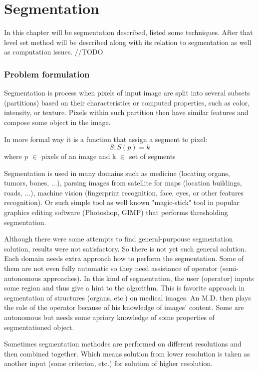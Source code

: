\chapter{Segmentation}

In this chapter will be segmentation described, listed some techniques. After that level set method will be described along with its relation to segmentation as well as computation issues. //TODO

\subsection{Problem formulation}
Segmentation is process when pixels of input image are split into several subsets (partitions) based on their characteristics or computed properties, such as color, intensity, or texture. Pixels within such partition then have similar features and compose some object in the image.

In more formal way it is a function that assign a segment to pixel:
\begin{equation}
S: S(p) = k
\end{equation}
where p $\in$ pixels of an image and k $\in$ set of segments

Segmentation is used in many domains such as medicine (locating organs, tumors, bones, ...), parsing images from satellite for maps (location buildings, roads, ...), machine vision (fingerprint recognition, face, eyes, or other features recognition). Or such simple tool as well known "magic-stick" tool in popular graphics editing software (Photoshop, GIMP) that performs thresholding segmentation.

Although there were some attempts to find general-purpouse segmentation solution, results were not satisfactory. So there is not yet such general solution. Each domain needs extra approach how to perform the segmentation. Some of them are not even fully automatic so they need assistance of operator (semi-autonomous approaches). In this kind of segmentation, the user (operator) inputs some region and thus give a hint to the algorithm. This is favorite approach in segmentation of structures (organs, etc.) on medical images. An M.D. then plays the role of the operator because of his knowledge of images' content. Some are autonomous but needs some apriory knowledge of some properties of segmentationed object. 

Sometimes segmentation methodes are performed on different resolutions and then combined together. Which means solution from lower resolution is taken as another input (some criterion, etc.) for solution of higher resolution. 

